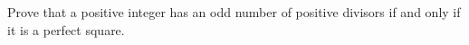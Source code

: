 Prove that a positive integer has an odd number of positive divisors if and only if it is a perfect square.
